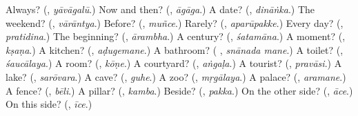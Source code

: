 \begin{tcolorbox}[breakable,colback=teal!4,colframe=teal!35!black,title={Before you move on}]
Always? (\textbf{}, \emph{yāvāgalū}.) Now and then? (\textbf{}, \emph{āgāga}.) A date? (\textbf{}, \emph{dināṅka}.) The weekend? (\textbf{}, \emph{vārāntya}.) Before? (\textbf{}, \emph{muñce}.) Rarely? (\textbf{}, \emph{aparūpakke}.) Every day? (\textbf{}, \emph{pratidina}.) The beginning? (\textbf{}, \emph{ārambha}.) A century? (\textbf{}, \emph{śatamāna}.) A moment? (\textbf{}, \emph{kṣaṇa}.) A kitchen? (\textbf{}, \emph{aḍugemane}.) A bathroom? (\textbf{ }, \emph{snānada mane}.) A toilet? (\textbf{}, \emph{śaucālaya}.) A room? (\textbf{}, \emph{kōṇe}.) A courtyard? (\textbf{}, \emph{aṅgaḷa}.) A tourist? (\textbf{}, \emph{pravāsi}.) A lake? (\textbf{}, \emph{sarōvara}.) A cave? (\textbf{}, \emph{guhe}.) A zoo? (\textbf{}, \emph{mṛgālaya}.) A palace? (\textbf{}, \emph{aramane}.) A fence? (\textbf{}, \emph{bēli}.) A pillar? (\textbf{}, \emph{kamba}.) Beside? (\textbf{}, \emph{pakka}.) On the other side? (\textbf{}, \emph{āce}.) On this side? (\textbf{}, \emph{īce}.)
\end{tcolorbox}
